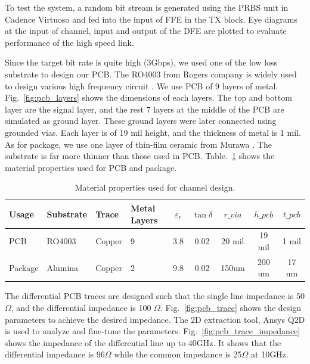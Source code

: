\documentclass{book}  %
\renewcommand{\section}[1]{\psection{#1}}
\renewcommand{\subsection}[1]{\psubsection{#1}}
\begin{document}
\begin{paper}
To test the system, a random bit stream is generated using the PRBS unit in Cadence Virtuoso and fed into the input of FFE in the TX block. Eye diagrams at the input of channel, input and output of the DFE are plotted to evaluate performance of the high speed link.


\section{Channel Design}
\label{sec:channel_design}

Since the target bit rate is quite high (3Gbps), we used one of the low loss substrate to design our PCB. The RO4003 from Rogers company is widely used to design various high frequency circuit \cite{na_ro4003_rogers}. We use PCB of 9 layers of metal. Fig.~\ref{fig:pcb_layers} shows the dimensions of each layers. The top and bottom layer are the signal layer, and the rest 7 layers at the middle of the PCB are simulated as ground layer. These ground layers were later connected using grounded vias. Each layer is of 19 mil height, and the thickness of metal is 1 mil. \\

As for package, we use one layer of thin-film ceramic from Murawa \cite{na_alumina_substratess}. The substrate is far more thinner than those used in PCB. Table.~\ref{table:material} shows the material properties used for PCB and package.

\begin{table}[h]
	\renewcommand{\arraystretch}{1.3}
	\caption{Material properties used for channel design.}
	\vskip0.2in
	\begin{center}
		\begin{tabular}{| l | l | l | l | c | c | c | c | c |}
			\hline
			Usage   & Substrate  & Trace & Metal Layers & $\varepsilon_r$ & $\tan\delta$ & $r\_via$ & $h\_pcb$ & $t\_pcb$\\ \hline
			PCB     & RO4003  \cite{na_ro4003_rogers} & Copper & 9 & 3.8 & 0.02 & 20 mil & 19 mil & 1 mil \\ \hline
			Package & Alumina \cite{na_alumina_substratess} & Copper & 2 & 9.8 & 0.02 & 150um & 200 um & 17 um \\
			\hline
		\end{tabular}
	\end{center}
	\label{table:material}			
\end{table}


\subsection{PCB Traces}
\label{subsec:pcb_traces}
The differential PCB traces are designed such that the single line impedance is 50 $\Omega$, and the differential impedance is 100 $\Omega$. Fig.~\ref{fig:pcb_trace} shows the design parameters to achieve the desired impedance. The 2D extraction tool, Ansys Q2D is used to analyze and fine-tune the parameters. Fig.~\ref{fig:pcb_trace_impedance} shows the impedance of the differential line up to 40GHz. It shows that the differential impedance is 96$\Omega$ while the common impedance is 25$\Omega$ at 10GHz. 



\end{paper}
\end{document}
